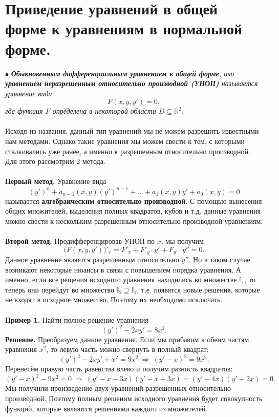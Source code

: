 \documentclass[a4paper, 12pt]{article}
\newcommand{\Rm}{\mathbb{R}}
\newcommand{\I}{\mathbb{I}}
\begin{document}
	\section*{Приведение уравнений в общей форме к уравнениям в нормальной форме.}
	$\bullet$ \textit{\textbf{Обыкновенным дифференциальным уравнением в общей форме}, или \textbf{уравнением неразрешенным относительно производной (УНОП)} называется уравнение вида $$F(x,y,y') = 0,$$ где функция $F$ определена в некоторой области $D\subseteq \Rm^2$.}\\\\
	Исходя из названия, данный тип уравнений мы не можем разрешить известными нам методами. Однако такие уравнения мы можем свести к тем, с которыми сталкивались уже ранее, а именно к разрешенным относительно производной. Для этого рассмотрим 2 метода.\\\\
	\textbf{Первый метод.} Уравнение вида $$(y')^n + a_{n-1}(x,y)(y')^{n-1} + \ldots + a_1(x,y)y' + a_0(x,y) = 0$$ называется \textbf{алгебраическим относительно производной}. С помощью вынесения общих множителей, выделения полных квадратов, кубов и т.д. данные уравнения можно свести к нескольким разрешенным относительно производной уравнениям.\\\\
	\textbf{Второй метод.} Продифференцировав УНОП по $x$, мы получим $$\Big(F(x,y,y')\Big)'_x = F'_x + F'_y\cdot y' + F_{y'}\cdot y'' = 0.$$
	Данное уравнение является разрешенным относительно $y''$. Но в таком случае возникают некоторые нюансы в связи с повышением порядка уравнения. А именно, если все рещения исходного уравнения находились во множестве $\I_1$, то теперь они перейдут во множество $\I_2 \supseteq \I_1$, т.е. появятся новые решения, которые не входят в исходное множество. Поэтому их необходимо исключать.\\\\
	\textbf{Пример 1.} Найти полное решение уравнения $$(y')^2 - 2xy' = 8x^2.$$
	\textbf{Решение.} Преобразуем данное уравнение. Если мы прибавим к обеим частям уравнения $x^2$, то левую часть можно свернуть в полный квадрат:
	$$(y')^2 - 2xy' + x^2 = 9x^2\ \Rightarrow\ (y' - x)^2 = 9x^2.$$
	Перенесём правую часть равенства влево и получим разность квадратов:
	$$(y' - x)^2 - 9x^2 = 0 \ \Rightarrow\ (y' - x - 3x)(y' - x + 3x) = (y' - 4x)(y' + 2x)= 0.$$
	Мы получили произведение двух уравнений разрешенных относительно производной. Поэтому полным решеним исходного уравнения будет совокупность функций, которые являются решениями каждого из множителей.\\\\
\end{document}
